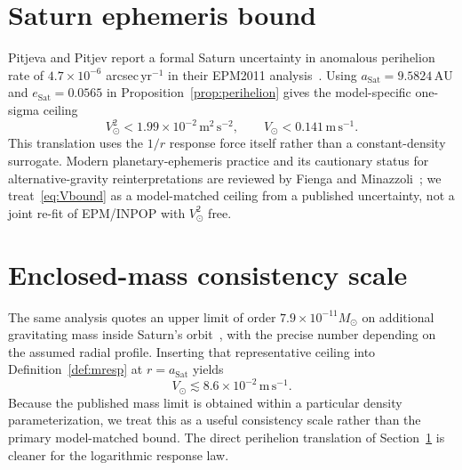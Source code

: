 \documentclass[11pt]{article}
\theoremstyle{definition}
\theoremstyle{remark}
\newcommand{\AU}{\mathrm{AU}}
\newcommand{\Msun}{M_\odot}
\begin{document}
\section{Saturn ephemeris bound}
\label{sec:saturn-bound}
Pitjeva and Pitjev report a formal Saturn uncertainty in anomalous perihelion rate of $4.7\times10^{-6}$ arcsec\,yr$^{-1}$ in their EPM2011 analysis~\cite{Pitjeva2013}.
Using $a_{\mathrm{Sat}}=9.5824\,\AU$ and $e_{\mathrm{Sat}}=0.0565$ in Proposition~\ref{prop:perihelion} gives the model-specific one-sigma ceiling
\begin{equation}
\label{eq:Vbound}
\boxed{V_\odot^{2}<1.99\times10^{-2}\,\mathrm{m^{2}\,s^{-2}},\qquad
V_\odot<0.141\,\mathrm{m\,s^{-1}}.}
\end{equation}
This translation uses the $1/r$ response force itself rather than a constant-density surrogate.
Modern planetary-ephemeris practice and its cautionary status for alternative-gravity reinterpretations are reviewed by Fienga and Minazzoli~\cite{Fienga2024}; we treat~\eqref{eq:Vbound} as a model-matched ceiling from a published uncertainty, not a joint re-fit of EPM/INPOP with $V_\odot^{2}$ free.

\section{Enclosed-mass consistency scale}
\label{sec:mass-bound}
The same analysis quotes an upper limit of order $7.9\times10^{-11}\Msun$ on additional gravitating mass inside Saturn's orbit~\cite{Pitjeva2013}, with the precise number depending on the assumed radial profile.
Inserting that representative ceiling into Definition~\ref{def:mresp} at $r=a_{\mathrm{Sat}}$ yields
\begin{equation}
V_\odot\lesssim8.6\times10^{-2}\,\mathrm{m\,s^{-1}}.
\end{equation}
Because the published mass limit is obtained within a particular density parameterization, we treat this as a useful consistency scale rather than the primary model-matched bound.
The direct perihelion translation of Section~\ref{sec:saturn-bound} is cleaner for the logarithmic response law.
\end{document}
